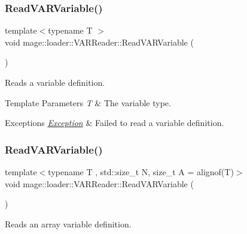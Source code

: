 \subsubsection{\texorpdfstring{Read\+V\+A\+R\+Variable()}{ReadVARVariable()}\hspace{0.1cm}{\footnotesize\ttfamily [1/2]}}
{\footnotesize\ttfamily template$<$typename T $>$ \\
void mage\+::loader\+::\+V\+A\+R\+Reader\+::\+Read\+V\+A\+R\+Variable (\begin{DoxyParamCaption}{ }\end{DoxyParamCaption})\hspace{0.3cm}{\ttfamily [private]}}

Reads a variable definition.


\begin{DoxyTemplParams}{Template Parameters}
{\em T} & The variable type. \\
\hline
\end{DoxyTemplParams}

\begin{DoxyExceptions}{Exceptions}
{\em \mbox{\hyperlink{classmage_1_1_exception}{Exception}}} & Failed to read a variable definition. \\
\hline
\end{DoxyExceptions}
\mbox{\label{classmage_1_1loader_1_1_v_a_r_reader_aa27db2b3ba9c66dbdd2c75c6aba1848c}} 
\subsubsection{\texorpdfstring{Read\+V\+A\+R\+Variable()}{ReadVARVariable()}\hspace{0.1cm}{\footnotesize\ttfamily [2/2]}}
{\footnotesize\ttfamily template$<$typename T , std\+::size\+\_\+t N, size\+\_\+t A = alignof(\+T)$>$ \\
void mage\+::loader\+::\+V\+A\+R\+Reader\+::\+Read\+V\+A\+R\+Variable (\begin{DoxyParamCaption}{ }\end{DoxyParamCaption})\hspace{0.3cm}{\ttfamily [private]}}

Reads an array variable definition.


